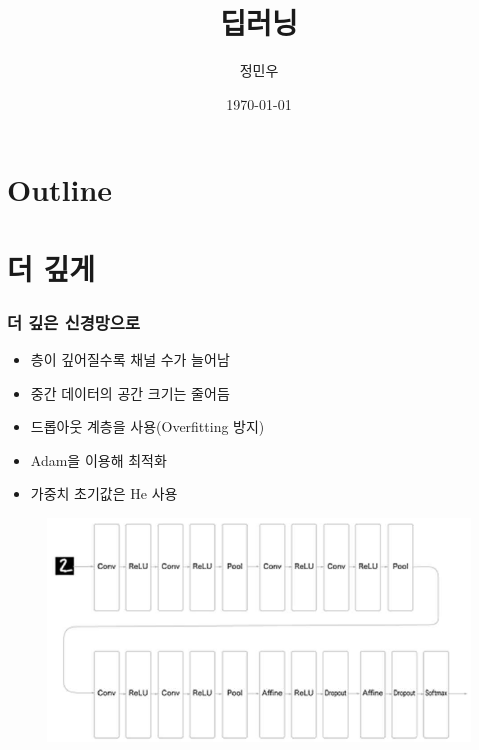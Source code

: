 \documentclass{beamer}
\begin{document}
\begin{frame}
	\title{딥러닝}
	\author{정민우}
	\date{\today}
	\titlepage
\end{frame}



\section*{Outline}
\begin{frame}
\tableofcontents
\end{frame}



\section{더 깊게}

\begin{frame}
	\frametitle{더 깊은 신경망으로}
	\begin{itemize}
		\item 층이 깊어질수록 채널 수가 늘어남
		\item 중간 데이터의 공간 크기는 줄어듬
		\item 드롭아웃 계층을 사용(Overfitting 방지)
		\item Adam을 이용해 최적화
		\item 가중치 초기값은 He 사용
	\end{itemize}
	\begin{figure}
		\includegraphics[width=0.5\columnwidth]{Fig_deep/Figure_1.pdf}
	\end{figure}
\end{frame}
\end{document}
